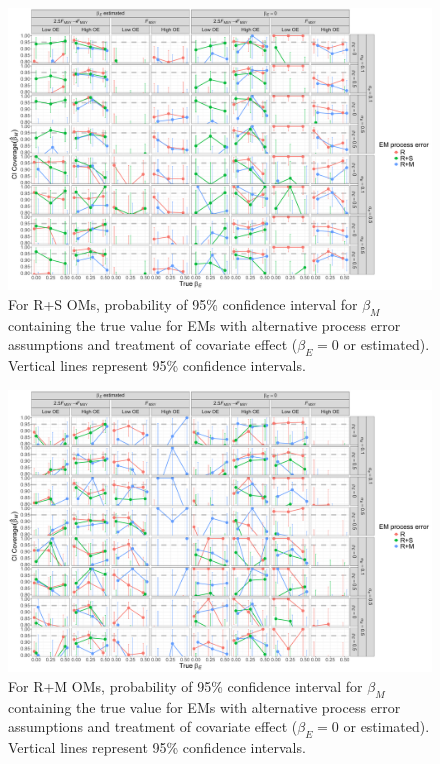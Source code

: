 \documentclass[
  12pt,
]{article}
\begin{document}
\begin{landscape}
\begin{figure}
\begin{center}
\includegraphics[height = \textheight]{beta_M_CI_coverage_RSom}
\end{center}
\caption{For R+S OMs, probability of 95\% confidence interval for $\beta_M$ containing the true value for EMs with alternative process error assumptions and treatment of covariate effect ($\beta_E = 0$ or estimated). Vertical lines represent 95\% confidence intervals.}\label{beta_M_CI_coverage_RSom}
\end{figure}
\end{landscape}

\begin{landscape}
\begin{figure}
\begin{center}
\includegraphics[height = \textheight]{beta_M_CI_coverage_RMom}
\end{center}
\caption{For R+M OMs, probability of 95\% confidence interval for $\beta_M$ containing the true value for EMs with alternative process error assumptions and treatment of covariate effect ($\beta_E = 0$ or estimated). Vertical lines represent 95\% confidence intervals.}\label{beta_M_CI_coverage_RMom}
\end{figure}
\end{landscape}
\end{document}
